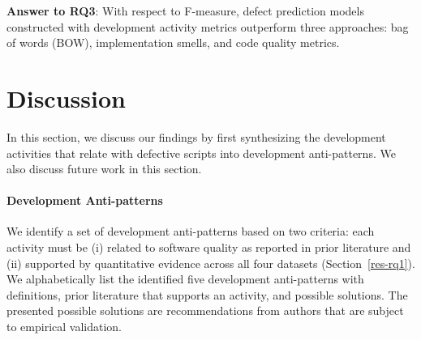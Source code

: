 \documentclass[smallextended]{svjour3}       %
\begin{document}





\begin{mdframed}
\textbf{Answer to RQ3}: With respect to F-measure, defect prediction models constructed with development activity metrics outperform three approaches: bag of words (BOW), implementation smells, and code quality metrics. 
\end{mdframed}


\section{Discussion}
\label{discussion}

In this section, we discuss our findings by first synthesizing the development activities that relate with defective scripts into development anti-patterns. We also discuss future work in this section. 

\paragraph{Development Anti-patterns}
\label{only-anti-pattern}

We identify a set of development anti-patterns based on two criteria: each activity must be (i) related to software quality as reported in prior literature and (ii) supported by quantitative evidence across all four datasets (Section~\ref{res-rq1}). We alphabetically list the identified five development anti-patterns with definitions, prior literature that supports an activity, and possible solutions. The presented possible solutions are recommendations from authors that are subject to empirical validation.  
\end{document}
